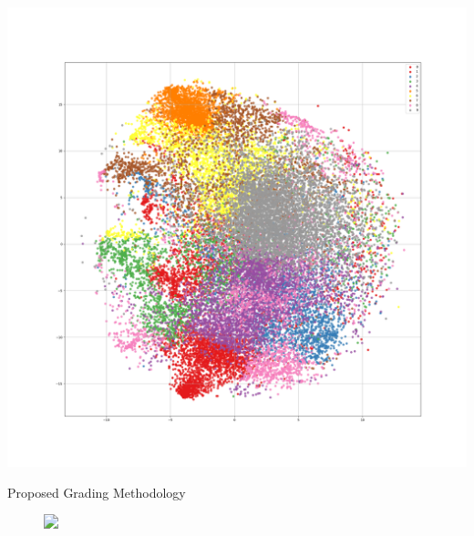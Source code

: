 \documentclass[usenames,dvipsnames]{beamer}
\begin{document}
\begin{frame}
  \includegraphics[width=\textwidth]{imagenes_cnn/Tsne_alpha90_cluster10.png}
\end{frame}




%


\begin{frame}{Proposed Grading Methodology}
\begin{figure}
\centering
\includegraphics<1>[width=0.95\linewidth]{imagenes/metodo_sipaim2017.png}
\end{figure}
\end{frame}
\end{document}
